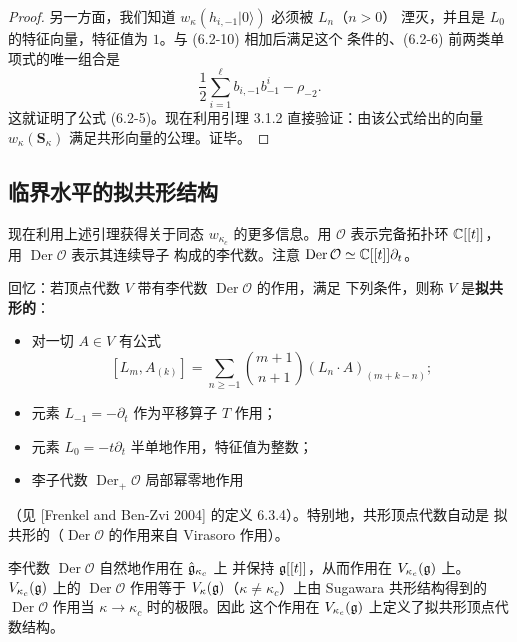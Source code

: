 \begin{proof}
    另一方面，我们知道 $w_\kappa(h_{i,-1}|0\rangle)$ 必须被 $L_n$（$n>0$）
    湮灭，并且是 $L_0$ 的特征向量，特征值为 $1$。与 (6.2-10) 相加后满足这个
    条件的、(6.2-6) 前两类单项式的唯一组合是
    \begin{equation}
        \frac12\sum_{i=1}^\ell b_{i,-1}b^i_{-1}-\rho_{-2}.
        \tag{6.2-12}
    \end{equation}
    这就证明了公式 (6.2-5)。现在利用引理 3.1.2 直接验证：由该公式给出的向量
    $w_\kappa(\mathbf S_\kappa)$ 满足共形向量的公理。证毕。
\end{proof}

\subsection{临界水平的拟共形结构}

现在利用上述引理获得关于同态 $w_{\kappa_c}$ 的更多信息。用 $\mathcal O$
表示完备拓扑环 $\mathbb{C}[[t]]$，用 $\operatorname{Der}\mathcal O$ 表示其连续导子
构成的李代数。注意
$\operatorname{Der}\mathcal O\simeq\mathbb{C}[[t]]\partial_t$。

回忆：若顶点代数 $V$ 带有李代数 $\operatorname{Der}\mathcal O$ 的作用，满足
下列条件，则称 $V$ 是\textbf{拟共形的}：
\begin{itemize}[leftmargin=2em]
    \item 对一切 $A\in V$ 有公式
    \[
        [L_m,A_{(k)}]=\sum_{n\ge-1}\binom{m+1}{n+1}
        (L_n\cdot A)_{(m+k-n)};
    \]
    \item 元素 $L_{-1}=-\partial_t$ 作为平移算子 $T$ 作用；
    \item 元素 $L_0=-t\partial_t$ 半单地作用，特征值为整数；
    \item 李子代数 $\operatorname{Der}_+\mathcal O$ 局部幂零地作用
\end{itemize}
（见 [Frenkel and Ben-Zvi 2004] 的定义 6.3.4）。特别地，共形顶点代数自动是
拟共形的（$\operatorname{Der}\mathcal O$ 的作用来自 Virasoro 作用）。

李代数 $\operatorname{Der}\mathcal O$ 自然地作用在 $\hat{\mathfrak{g}}_{\kappa_c}$ 上
并保持 $\mathfrak{g}[[t]]$，从而作用在 $V_{\kappa_c}(\mathfrak{g})$ 上。
$V_{\kappa_c}(\mathfrak{g})$ 上的 $\operatorname{Der}\mathcal O$ 作用等于
$V_\kappa(\mathfrak{g})$（$\kappa\ne\kappa_c$）上由 Sugawara 共形结构得到的
$\operatorname{Der}\mathcal O$ 作用当 $\kappa\to\kappa_c$ 时的极限。因此
这个作用在 $V_{\kappa_c}(\mathfrak{g})$ 上定义了拟共形顶点代数结构。


